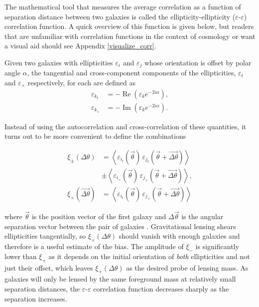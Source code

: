 \documentclass[%
 reprint,
 amsmath,amssymb,
 aps,nofootinbib
]{revtex4-1}
\begin{document}
The mathematical tool that measures the average correlation as a function of separation distance between two galaxies is called the ellipticity-ellipticity ($\varepsilon$-$\varepsilon$) correlation function. A quick overview of this function is given below, but readers that are unfamiliar with correlation functions in the context of cosmology or want a visual aid should see Appendix \ref{visualize_corr}.

Given two galaxies with ellipticities $\varepsilon_i$ and $\varepsilon_j$ whose orientation is offset by polar angle $\alpha$, the tangential and cross-component components of the ellipticities, $\varepsilon_t$ and $\varepsilon_\times$ respectively, for each are defined as
\begin{align}
\varepsilon_{k_t}&=-\operatorname{Re}\left(\varepsilon_k e^{-2i\alpha}\right),\\
\varepsilon_{k_\times}&=-\operatorname{Im}\left(\varepsilon_k e^{-2i\alpha}\right).
\end{align}

\noindent Instead of using the autocorrelation and cross-correlation of these quantities, it turns out to be more convenient to define the combinations

\begin{align}\label{gg_corr_def}
\xi_\pm(\Delta\theta)&=\left<\varepsilon_{i_t}(\vec{\theta})\,\varepsilon_{j_t}(\vec{\theta}+\vec{\Delta\theta})\right>\nonumber \\
&\pm\left<\varepsilon_{i_\times}(\vec{\theta})\,\varepsilon_{j_\times}(\vec{\theta}+\vec{\Delta\theta})\right>,\\
\xi_\times(\vec{\Delta\theta})&=\left<\varepsilon_{i_t}(\vec{\theta})\,\varepsilon_{j_\times}(\vec{\theta}+\vec{\Delta\theta})\right>
\end{align}

\noindent where $\vec{\theta}$ is the position vector of the first galaxy and $\Delta\vec{\theta}$ is the angular separation vector between the pair of galaxies \cite{schneider}. Gravitational lensing shears ellipticities tangentially, so $\xi_\times(\Delta\theta)$ should vanish with enough galaxies and therefore is a useful estimate of the bias. The amplitude of $\xi_-$ is significantly lower than $\xi_+$ as it depends on the initial orientation of \textit{both} ellipticities and not just their offset, which leaves $\xi_+(\Delta\theta)$ as the desired probe of lensing mass. As galaxies will only be lensed by the same foreground mass at relatively small separation distances, the $\varepsilon$-$\varepsilon$ correlation function decreases sharply as the separation increases. %
\end{document}
